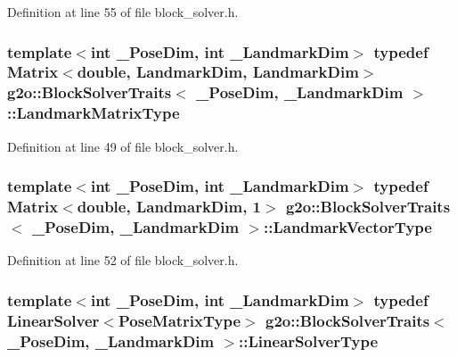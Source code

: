 Definition at line 55 of file block\+\_\+solver.\+h.

\subsubsection[{\texorpdfstring{Landmark\+Matrix\+Type}{LandmarkMatrixType}}]{\setlength{\rightskip}{0pt plus 5cm}template$<$int \+\_\+\+Pose\+Dim, int \+\_\+\+Landmark\+Dim$>$ typedef Matrix$<$double, {\bf Landmark\+Dim}, {\bf Landmark\+Dim}$>$ {\bf g2o\+::\+Block\+Solver\+Traits}$<$ \+\_\+\+Pose\+Dim, \+\_\+\+Landmark\+Dim $>$\+::{\bf Landmark\+Matrix\+Type}}\hypertarget{structg2o_1_1BlockSolverTraits_add9b9fbfef352b7654d41914d5eaa58c}{}\label{structg2o_1_1BlockSolverTraits_add9b9fbfef352b7654d41914d5eaa58c}


Definition at line 49 of file block\+\_\+solver.\+h.

\subsubsection[{\texorpdfstring{Landmark\+Vector\+Type}{LandmarkVectorType}}]{\setlength{\rightskip}{0pt plus 5cm}template$<$int \+\_\+\+Pose\+Dim, int \+\_\+\+Landmark\+Dim$>$ typedef Matrix$<$double, {\bf Landmark\+Dim}, 1$>$ {\bf g2o\+::\+Block\+Solver\+Traits}$<$ \+\_\+\+Pose\+Dim, \+\_\+\+Landmark\+Dim $>$\+::{\bf Landmark\+Vector\+Type}}\hypertarget{structg2o_1_1BlockSolverTraits_af5154a15abb566ff5bffc0adb9f0458d}{}\label{structg2o_1_1BlockSolverTraits_af5154a15abb566ff5bffc0adb9f0458d}


Definition at line 52 of file block\+\_\+solver.\+h.

\subsubsection[{\texorpdfstring{Linear\+Solver\+Type}{LinearSolverType}}]{\setlength{\rightskip}{0pt plus 5cm}template$<$int \+\_\+\+Pose\+Dim, int \+\_\+\+Landmark\+Dim$>$ typedef {\bf Linear\+Solver}$<${\bf Pose\+Matrix\+Type}$>$ {\bf g2o\+::\+Block\+Solver\+Traits}$<$ \+\_\+\+Pose\+Dim, \+\_\+\+Landmark\+Dim $>$\+::{\bf Linear\+Solver\+Type}}\hypertarget{structg2o_1_1BlockSolverTraits_add6edae08cb0665c2b1e7c641cdb4dc4}{}\label{structg2o_1_1BlockSolverTraits_add6edae08cb0665c2b1e7c641cdb4dc4}


